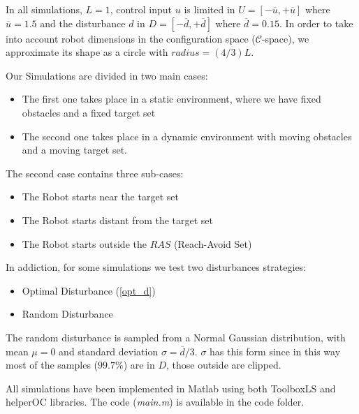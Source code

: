 In all simulations, $L=1$, control input $u$ is limited in $U = [-\overline{u}, +\overline{u}]$ where $\overline{u}=1.5$ and the disturbance $d$ in $D=[-\overline{d}, +\overline{d}]$ where $\overline{d}=0.15$. In order to take into account robot dimensions in the configuration space ($\mathcal{C}$-space), we approximate its shape as a circle with $radius = (4/3)L$.

Our Simulations are divided in two main cases: 
\begin{itemize}
    \item The first one takes place in a static environment, where we have fixed obstacles and a fixed target set 
    \item The second one takes place in a dynamic environment with moving obstacles and a moving target set.
\end{itemize}
The second case contains three sub-cases:  
\begin{itemize}
    \item The Robot starts near the target set
    \item The Robot starts distant from the target set
    \item The Robot starts outside the $RAS$ (Reach-Avoid Set)
\end{itemize}
In addiction, for some simulations we test two disturbances strategies: 
\begin{itemize}
    \item Optimal Disturbance (\ref{opt_d})
    \item Random Disturbance 
\end{itemize}
The random disturbance is sampled from a Normal Gaussian distribution, with mean $\mu=0$ and standard deviation $\sigma=\overline{d}/3$. $\sigma$ has this form since in this way most of the samples ($99.7\%$) are in $D$, those outside are clipped.

All simulations have been implemented in Matlab using both ToolboxLS \cite{LS} and helperOC \cite{brief_intro} libraries. The code (\textit{main.m}) is available in the code folder.

